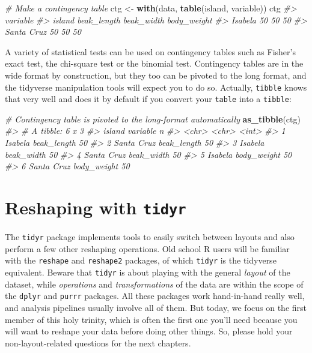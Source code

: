 \documentclass[]{book}
\newenvironment{Shaded}{}{}
\newcommand{\CommentTok}[1]{\textcolor[rgb]{0.38,0.63,0.69}{\textit{#1}}}
\newcommand{\KeywordTok}[1]{\textcolor[rgb]{0.00,0.44,0.13}{\textbf{#1}}}
\newcommand{\NormalTok}[1]{#1}
\newcommand{\StringTok}[1]{\textcolor[rgb]{0.25,0.44,0.63}{#1}}
\begin{document}
\begin{Shaded}
\begin{Highlighting}[]
\CommentTok{# Make a contingency table}
\NormalTok{ctg <-}\StringTok{ }\KeywordTok{with}\NormalTok{(data, }\KeywordTok{table}\NormalTok{(island, variable))}
\NormalTok{ctg}
\CommentTok{#>             variable}
\CommentTok{#> island       beak_length beak_width body_weight}
\CommentTok{#>   Isabela             50         50          50}
\CommentTok{#>   Santa Cruz          50         50          50}
\end{Highlighting}
\end{Shaded}

A variety of statistical tests can be used on contingency tables such as Fisher's exact test, the chi-square test or the binomial test. Contingency tables are in the wide format by construction, but they too can be pivoted to the long format, and the tidyverse manipulation tools will expect you to do so. Actually, \texttt{tibble} knows that very well and does it by default if you convert your \texttt{table} into a \texttt{tibble}:

\begin{Shaded}
\begin{Highlighting}[]
\CommentTok{# Contingency table is pivoted to the long-format automatically}
\KeywordTok{as_tibble}\NormalTok{(ctg)}
\CommentTok{#> # A tibble: 6 x 3}
\CommentTok{#>   island     variable        n}
\CommentTok{#>   <chr>      <chr>       <int>}
\CommentTok{#> 1 Isabela    beak_length    50}
\CommentTok{#> 2 Santa Cruz beak_length    50}
\CommentTok{#> 3 Isabela    beak_width     50}
\CommentTok{#> 4 Santa Cruz beak_width     50}
\CommentTok{#> 5 Isabela    body_weight    50}
\CommentTok{#> 6 Santa Cruz body_weight    50}
\end{Highlighting}
\end{Shaded}

\hypertarget{reshaping-with-tidyr}{%
\section{\texorpdfstring{Reshaping with \texttt{tidyr}}{Reshaping with tidyr}}\label{reshaping-with-tidyr}}

The \texttt{tidyr} package implements tools to easily switch between layouts and also perform a few other reshaping operations. Old school R users will be familiar with the \texttt{reshape} and \texttt{reshape2} packages, of which \texttt{tidyr} is the tidyverse equivalent. Beware that \texttt{tidyr} is about playing with the general \emph{layout} of the dataset, while \emph{operations} and \emph{transformations} of the data are within the scope of the \texttt{dplyr} and \texttt{purrr} packages. All these packages work hand-in-hand really well, and analysis pipelines usually involve all of them. But today, we focus on the first member of this holy trinity, which is often the first one you'll need because you will want to reshape your data before doing other things. So, please hold your non-layout-related questions for the next chapters.
\end{document}
